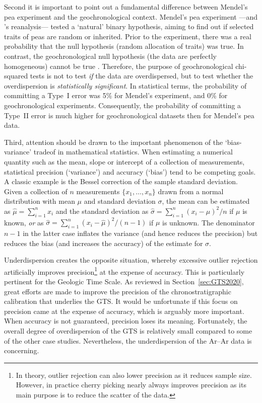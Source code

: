 \documentclass[gchron, manuscript]{copernicus}
\begin{document}
Second it is important to point out a fundamental difference between
Mendel's pea experiment and the geochronological context. Mendel's pea
experiment ---and \citet{fisher1936}'s reanalysis--- tested a
`natural' binary hypothesis, aiming to find out if selected traits of
peas are random or inherited.  Prior to the experiment, there was a
real probability that the null hypothesis (random allocation of
traits) was true. In contrast, the geochronological null hypothesis
(the data are perfectly homogeneous) cannot be true
\citep{vermeesch2025c}. Therefore, the purpose of geochronological
chi-squared tests is not to test \emph{if} the data are overdispersed,
but to test whether the overdispersion is \emph{statistically
significant}. In statistical terms, the probability of committing a
Type~I error was 5\% for Mendel's experiment, and 0\% for
geochronological experiments. Consequently, the probability of
committing a Type~II error is much higher for geochronological
datasets then for Mendel's pea data.\medskip

Third, attention should be drawn to the important phenomenon of the
`bias-variance' tradeof in mathematical statistics. When estimating a
numerical quantity such as the mean, slope or intercept of a
collection of measurements, statistical precision (`variance') and
accuracy (`bias') tend to be competing goals. A classic example is the
Bessel correction of the sample standard deviation. Given a collection
of $n$ measurements $\{x_1,\ldots,x_n\}$ drawn from a normal
distribution with mean $\mu$ and standard deviation $\sigma$, the mean
can be estimated as $\hat{\mu} = \sum_{i=1}^n x_i$ and the standard
deviation as $\hat{\sigma} = \sum_{i=1}^{n}(x_i-\mu)^2/n$ if $\mu$ is
known, \emph{or} as $\hat{\sigma} =
\sum_{i=1}^{n}(x_i-\hat{\mu})^2/(n-1)$ if $\mu$ is unknown. The
denominator $n-1$ in the latter case inflates the variance (and hence
reduces the precision) but reduces the bias (and increases the
accuracy) of the estimate for $\sigma$.\medskip

Underdispersion creates the opposite situation, whereby excessive
outlier rejection artificially improves precision\footnote{In theory,
outlier rejection can also lower precision as it reduces sample
size. However, in practice cherry picking nearly always improves
precision as its main purpose is to reduce the scatter of the data.}
at the expense of accuracy. This is particularly pertinent for the
Geologic Time Scale.  As reviewed in Section~\ref{sec:GTS2020}, great
efforts are made to improve the precision of the chronostratigraphic
calibration that underlies the GTS. It would be unfortunate if this
focus on precision came at the expense of accuracy, which is arguably
more important. When accuracy is not guaranteed, precision loses its
meaning. Fortunately, the overall degree of overdispersion of the GTS
is relatively small compared to some of the other case
studies. Nevertheless, the underdispersion of the Ar--Ar data is
concerning.\medskip
\end{document}
